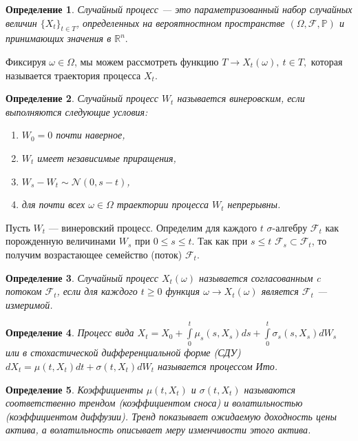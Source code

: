 \documentclass[a4paper, 12pt]{extreport}
\newtheorem{definition}{Определение}
\numberwithin{equation}{section}
\begin{document}
	\begin{definition}
		Случайный процесс --- это параметризованный набор случайных величин $\{X_t\}_{t \in T} $, определенных на вероятностном пространстве $(\Omega,\mathcal{F},\mathbb{P})$ и принимающих значения в $\mathbb{R}^n .$
	\end{definition}
	
	Фиксируя $\omega \in \Omega$, мы можем рассмотреть функцию $T \to X_t(\omega),\: t \in T,$ которая называется траектория процесса $X_t$.

	\begin{definition}
		Случайный процесс $W_t$ называется винеровским,
		если выполняются следующие условия:
		\begin{enumerate}
			\item $W_0 = 0$ почти наверное,
			\item $W_t$ имеет независимые приращения, 
			\item $W_s - W_t \sim \mathcal{N}(0,s-t)$,
			\item для почти всех $\omega \in \Omega $ траектории процесса $W_t$ непрерывны.
		\end{enumerate}
		
	\end{definition}	
	
	
	Пусть $W_t$ --- винеровский процесс. Определим для каждого $t$ $\sigma$-алгебру $\mathcal{F}_t$ как порожденную величинами $W_s$ при $0\leqslant s \leqslant t.$ Так как при $s \leqslant t$ $\mathcal{F}_s \subset  \mathcal{F}_t$, то получим возрастающее семейство (поток) {$ \mathcal{F}_t$}.
	
	\begin{definition}
		Случайный процесс $X_t(\omega)$ называется согласованным c потоком {$\mathcal{F}_t$}, если для каждого $t \geqslant 0$ функция $\omega \to X_t(\omega)$ является $\mathcal{F}_t$ --- измеримой.
		
	\end{definition}
	
	\begin{definition}
		Процесс вида $X_t = X_0 + \int\limits_0^t \mu_s(s,X_s) ds + \int\limits_0^t \sigma_s(s,X_s) dW_s $ или в стохастической дифференциальной форме (СДУ) $dX_t = \mu(t,X_t)dt + \sigma(t,X_t) dW_t $ называется процессом Ито.
	\end{definition}
	
	\begin{definition}
		Коэффициенты $\mu(t,X_t)$ и $\sigma(t,X_t)$ называются соответственно трендом (коэффициентом сноса) и волатильностью (коэффициентом диффузии). Тренд показывает ожидаемую доходность цены актива, а волатильность описывает меру изменчивости этого актива.
	\end{definition}
	
\end{document}
